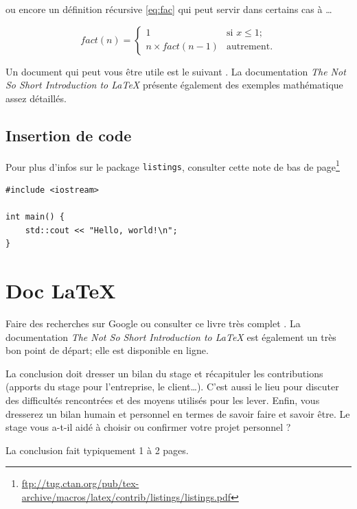\documentclass[12pt,oneside,noprintercorrection]{iut}
\begin{document}
ou encore un définition récursive \ref{eq:fac} qui peut servir dans certains cas à \ldots

\begin{equation} 
  fact(n) = \left\{ 
    \begin{array}{ll}
      1                  & \mbox{si $x \leq 1$};\\
      n \times fact(n-1) & \mbox{autrement}.
    \end{array} 
  \right.
  \label{eq:fac}
\end{equation}


Un document qui peut vous être utile est le suivant \cite{mshort}. La documentation {\em The Not So Short Introduction to \LaTeX} \cite{lshort} présente également des exemples mathématique assez détaillés.
\newpage %

\subsection{Insertion de code}

Pour plus d'infos sur le package {\tt listings}, consulter cette note de bas de page\footnote{
\url{ftp://tug.ctan.org/pub/tex-archive/macros/latex/contrib/listings/listings.pdf}

}

\begin{lstlisting}[frame=trBL]
#include <iostream>

int main() {
    std::cout << "Hello, world!\n";
}
\end{lstlisting}

\section{Doc \LaTeX}
Faire des recherches sur Google ou consulter ce livre très complet \cite{LatexCompanion}. La documentation {\em The Not So Short Introduction to \LaTeX} \cite{lshort} est également un très bon point de départ; elle est disponible en ligne.


\begin{aide}{}{}
  La conclusion doit dresser un bilan du stage et récapituler les contributions (apports du stage pour l'entreprise, le client\dots). C'est aussi le lieu pour discuter des difficultés rencontrées et des moyens utilisés pour les lever. Enfin, vous dresserez un bilan humain et personnel en termes de savoir faire et savoir être. Le stage vous a-t-il aidé à choisir ou confirmer votre projet personnel ?

  La conclusion fait typiquement 1 à 2 pages.
\end{aide}
\end{document}
